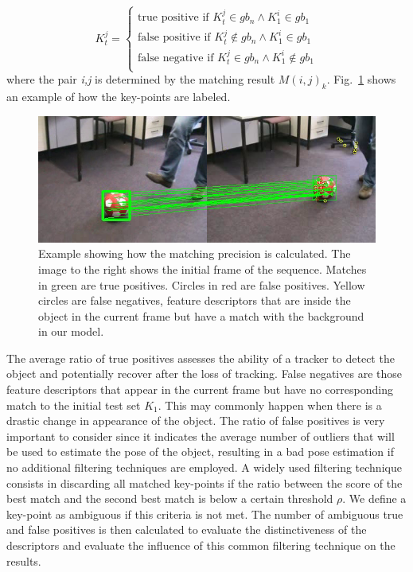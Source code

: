 \begin{equation}
K_{t}^{j} = 
\begin{cases}
\text{true positive}  \text{ if } K_{t}^{j} \in gb_{n} \land K_{1}^{i} \in gb_{1} \\
\text{false positive}  \text{ if } K_{t}^{j} \notin gb_{n} \land K_{1}^{i} \in gb_{1} \\
\text{false negative}  \text{ if } K_{t}^{j} \in gb_{n} \land K_{1}^{i} \notin gb_{1} \\
\end{cases}
\end{equation}
where the pair \textit{i,j} is determined by the matching result $M(i,j)_{k}$. Fig.~\ref{fig:matching} shows an example of how the key-points are labeled. 

\begin{figure}[!htb]
	\includegraphics[width=0.95\linewidth]{imgs/matching.png}
\vspace{-2.5mm}	
\caption{Example showing how the matching precision is calculated. The image to the right shows the initial frame of the sequence. Matches in green are true positives. Circles in red are false positives. Yellow circles are false negatives, feature descriptors that are inside the object in the current frame but have a match with the background in our model.}
\label{fig:matching}
\end{figure}

The average ratio of true positives assesses the ability of a tracker to detect the object and potentially recover after the loss of tracking. False negatives are those feature descriptors that appear in the current frame but have no corresponding match to the initial test set $K_{1}$. This may commonly happen when there is a drastic change in appearance of the object. The ratio of false positives is very important to consider since it indicates the average number of outliers that will be used to estimate the pose of the object, resulting in a bad pose estimation if no additional filtering techniques are employed. A widely used filtering technique consists in discarding all matched key-points if the ratio between the score of the best match and the second best match is below a certain threshold $\rho$. We define a key-point as ambiguous if this criteria is not met. The  number of ambiguous true and false positives is then calculated to evaluate the distinctiveness of the descriptors and evaluate the influence of this common filtering technique on the results.

